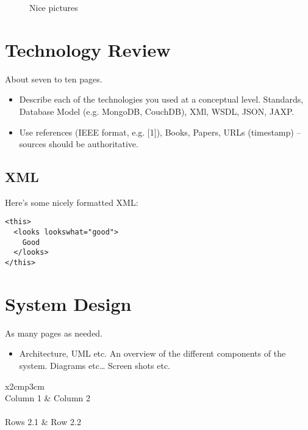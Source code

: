 \begin{figure}
  \centering
  \caption{Nice pictures}
  \label{tikz:graphs}
\end{figure}


\chapter{Technology Review}
About seven to ten pages.
\begin{itemize}
\item Describe each of the technologies you used at a conceptual level. Standards, Database Model (e.g. MongoDB, CouchDB), XMl, WSDL, JSON, JAXP.
\item Use references (IEEE format, e.g. [1]), Books, Papers, URLs (timestamp) – sources should be authoritative. 
\end{itemize}

\section{XML}
Here's some nicely formatted XML:
\begin{verbatim}
<this>
  <looks lookswhat="good">
    Good
  </looks>
</this>
\end{verbatim}

\chapter{System Design}
As many pages as needed.
\begin{itemize}
\item Architecture, UML etc. An overview of the different components of the system. Diagrams etc… Screen shots etc.
\end{itemize}

\begin{table}[h]
  \centering
  \begin{tabular}{x{2cm}p{3cm}}
    \toprule \\
    Column 1 & Column 2 \\
    \midrule \\
    Rows 2.1 & Row 2.2 \\
    \bottomrule
  \end{tabular}
  \caption{A table.}
  \label{table:mytable}
\end{table}


